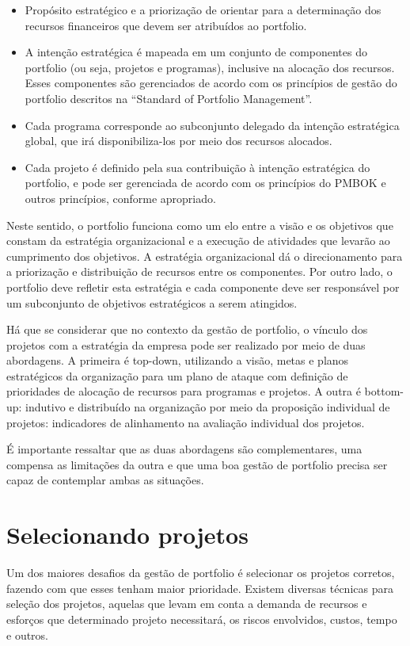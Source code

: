 \documentclass[12pt,a4paper,ruledheader,tocpage=prefix,floatnumber=continuous,pagestart=folhaderosto,font=times]{abnt}
\begin{document}
\begin{itemize}
 \item Propósito estratégico e a priorização de orientar para a determinação dos recursos financeiros que devem 
ser atribuídos ao portfolio.
  \item A intenção estratégica é mapeada em um conjunto de componentes do portfolio (ou seja, projetos e programas), inclusive na alocação 
dos recursos. Esses componentes são gerenciados de acordo com os princípios de gestão do portfolio descritos na ``Standard of Portfolio Management''.
  \item Cada programa corresponde ao subconjunto delegado da intenção estratégica global, que irá disponibiliza-los por meio dos recursos alocados.
  \item Cada projeto é definido pela sua contribuição à intenção estratégica do portfolio, e
pode ser gerenciada de acordo com os princípios do PMBOK e outros princípios, conforme apropriado.
\end{itemize}

Neste sentido, o portfolio funciona como um elo entre a visão e os objetivos que constam da estratégia organizacional e a execução de atividades que 
levarão ao cumprimento dos objetivos. A estratégia organizacional dá o direcionamento para a priorização e distribuição de recursos entre os componentes. 
Por outro lado, o portfolio deve refletir esta estratégia e cada componente deve ser responsável por um subconjunto de objetivos estratégicos a serem 
atingidos.\cite{ricardo}

Há que se considerar que no contexto da gestão de portfolio, o vínculo dos projetos com a estratégia da empresa pode ser realizado por meio de duas 
abordagens. A primeira é top-down, utilizando a visão, metas e planos estratégicos da organização para um plano de ataque com definição de prioridades 
de alocação de recursos para programas e projetos. A outra é bottom-up: indutivo e distribuído na organização por meio da proposição individual de 
projetos: indicadores de alinhamento na avaliação individual dos projetos. 

É importante ressaltar que as duas abordagens são complementares, uma compensa as limitações da outra e que uma boa gestão de portfolio precisa ser 
capaz de contemplar ambas as situações.\cite{artigo}

\section{Selecionando projetos}
Um dos maiores desafios da gestão de portfolio é selecionar os projetos corretos, fazendo com que esses tenham maior prioridade. Existem diversas 
técnicas para seleção dos projetos, aquelas que levam em conta a demanda de recursos e esforços que determinado projeto necessitará, os riscos envolvidos,
custos, tempo e outros. 
\end{document}
